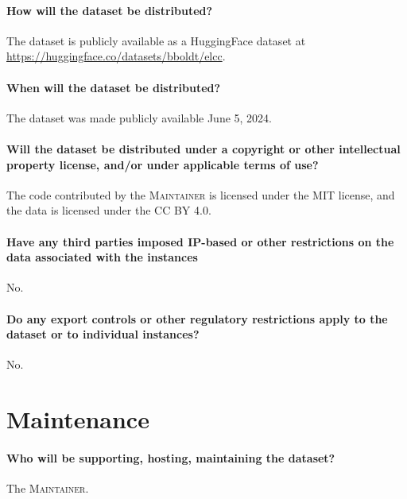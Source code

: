 \documentclass{article}
\newcommand\A{\textsc{Authors}}
\newcommand\M{\textsc{Maintainer}}
\begin{document}
\paragraph{How will the dataset be distributed?}
The dataset is publicly available as a HuggingFace dataset at \url{https://huggingface.co/datasets/bboldt/elcc}.

\paragraph{When will the dataset be distributed?}
The dataset was made publicly available June 5, 2024.

\paragraph{Will the dataset be distributed under a copyright or other intellectual property license, and/or under applicable terms of use?}
The code contributed by the \M{} is licensed under the MIT license, and the data is licensed under the CC BY 4.0.

\paragraph{Have any third parties imposed IP-based or other restrictions on the data associated with the instances}
No.

\paragraph{Do any export controls or other regulatory restrictions apply to the dataset or to individual instances?}
No.


\section{Maintenance}
\paragraph{Who will be supporting, hosting, maintaining the dataset?}
The \M{}.
\end{document}
